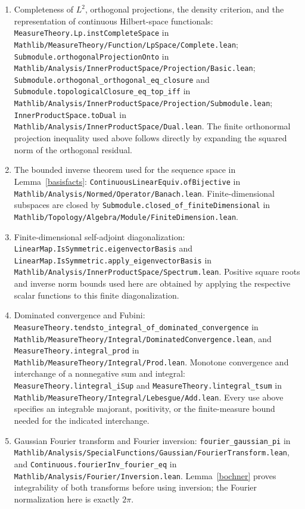 \documentclass[reqno,a4paper,12pt]{amsart}
\newcommand{\ml}[1]{\nolinkurl{#1}}
\begin{document}
\begingroup\small
\begin{enumerate}
\item Completeness of $L^2$, orthogonal projections, the density criterion,
and the representation of continuous Hilbert-space functionals:
\ml{MeasureTheory.Lp.instCompleteSpace} in
\ml{Mathlib/MeasureTheory/Function/LpSpace/Complete.lean};
\ml{Submodule.orthogonalProjectionOnto} in
\ml{Mathlib/Analysis/InnerProductSpace/Projection/Basic.lean};
\ml{Submodule.orthogonal_orthogonal_eq_closure} and
\ml{Submodule.topologicalClosure_eq_top_iff} in
\ml{Mathlib/Analysis/InnerProductSpace/Projection/Submodule.lean};
\ml{InnerProductSpace.toDual} in
\ml{Mathlib/Analysis/InnerProductSpace/Dual.lean}.
The finite orthonormal projection inequality used above follows directly
by expanding the squared norm of the orthogonal residual.
\item The bounded inverse theorem used for the sequence space in
Lemma~\ref{basisfacts}:
\ml{ContinuousLinearEquiv.ofBijective} in
\ml{Mathlib/Analysis/Normed/Operator/Banach.lean}.
Finite-dimensional subspaces are closed by
\ml{Submodule.closed_of_finiteDimensional} in
\ml{Mathlib/Topology/Algebra/Module/FiniteDimension.lean}.
\item Finite-dimensional self-adjoint diagonalization:
\ml{LinearMap.IsSymmetric.eigenvectorBasis} and
\ml{LinearMap.IsSymmetric.apply_eigenvectorBasis} in
\ml{Mathlib/Analysis/InnerProductSpace/Spectrum.lean}.
Positive square roots and inverse norm bounds used here are obtained
by applying the respective scalar functions to this finite diagonalization.
\item Dominated convergence and Fubini:
\ml{MeasureTheory.tendsto_integral_of_dominated_convergence} in
\ml{Mathlib/MeasureTheory/Integral/DominatedConvergence.lean}, and
\ml{MeasureTheory.integral_prod} in
\ml{Mathlib/MeasureTheory/Integral/Prod.lean}.
Monotone convergence and interchange of a nonnegative sum and integral:
\ml{MeasureTheory.lintegral_iSup} and
\ml{MeasureTheory.lintegral_tsum} in
\ml{Mathlib/MeasureTheory/Integral/Lebesgue/Add.lean}.
Every use above specifies an integrable majorant, positivity, or the
finite-measure bound needed for the indicated interchange.
\item Gaussian Fourier transform and Fourier inversion:
\ml{fourier_gaussian_pi} in
\ml{Mathlib/Analysis/SpecialFunctions/Gaussian/FourierTransform.lean}, and
\ml{Continuous.fourierInv_fourier_eq} in
\ml{Mathlib/Analysis/Fourier/Inversion.lean}.
Lemma~\ref{bochner} proves integrability of both transforms before
using inversion; the Fourier normalization here is exactly $2\pi$.

\end{enumerate}
\end{document}
